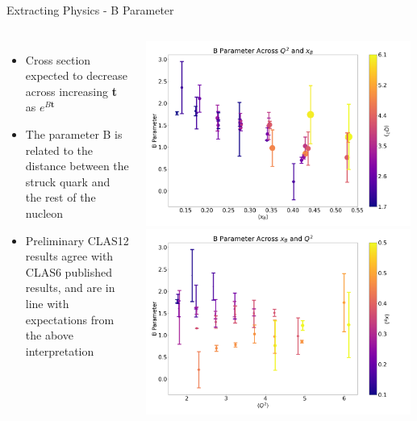 \documentclass[aspectratio=169]{beamer}
\begin{document}
\begin{frame}{Extracting Physics - B Parameter}

            \begin{columns}[t, onlytextwidth]

                        \begin{itemize}
                            \setlength\itemsep{2em}
                \item Cross section expected to decrease across increasing \textbf{t} as $e^{B\textbf{t}}$
                \item The parameter B is  related to the distance between the struck quark and the rest of the nucleon
                \item Preliminary CLAS12 results agree with CLAS6 published results, and are in line with expectations from the above interpretation
                
                \end{itemize}

            
                        \includegraphics[width=0.99\textwidth]{defense/B_vs_Q2_and_xB.png}
                         \includegraphics[width=0.99\textwidth]{defense/B_vs_xB_and_Q2.png}
            
\end{columns}
\end{frame}
\end{document}
